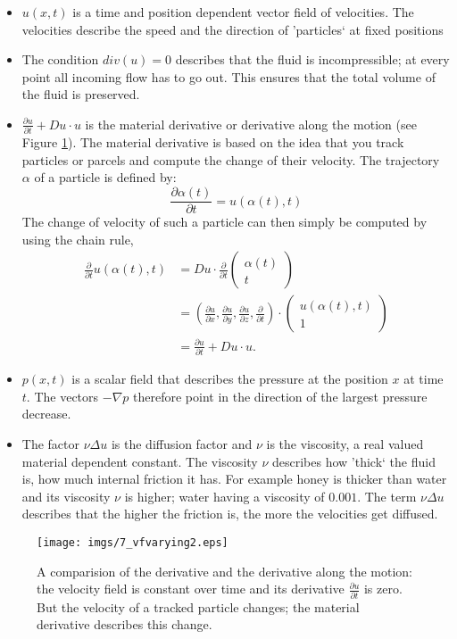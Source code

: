 \begin{itemize}
	\item $u(x,t)$ is a time and position dependent vector field of velocities. The velocities describe the speed and the direction of 'particles` at fixed positions
	\item The condition $div(u) = 0$ describes that the fluid is incompressible; at every point all incoming flow has to go out. This ensures that the total volume of the fluid is preserved.
	\item $\frac{\partial u}{\partial t} + D u \cdot u$ is the material derivative or derivative along the motion (see Figure \ref{fig:fsmaterialderivative}). The material derivative is based on the idea that you track particles or parcels and compute the change of their velocity. The trajectory $\alpha$ of a particle is defined by:
\[\frac{\partial \alpha(t)}{\partial t} = u(\alpha(t), t)\]
The change of velocity of such a particle can then simply be computed by using the chain rule,  
\begin{align*}\frac{\partial}{\partial t} u(\alpha(t),t) &= Du \cdot \frac{\partial}{\partial t}\begin{pmatrix}
\alpha(t) \\
t
\end{pmatrix}\\
&= (\frac{\partial u}{\partial x}, \frac{\partial u}{\partial y},\frac{\partial u}{\partial z}, \frac{\partial }{\partial t}) \cdot \begin{pmatrix}
u(\alpha(t),t) \\
1
\end{pmatrix} \\
&= \frac{\partial u}{\partial t} + Du \cdot u.
\end{align*}
\item $p(x,t)$ is a scalar field that describes the pressure at the position $x$ at time $t$. The vectors $-\nabla p$ therefore point in the direction of the largest pressure decrease.
\item The factor $\nu \Delta u$ is the diffusion factor and $\nu$ is the viscosity, a real valued material dependent constant. The viscosity $\nu$ describes how 'thick` the fluid is, how much internal friction it has. For example honey is thicker than water and its viscosity $\nu$ is higher; water having a viscosity of $0.001$. The term $\nu \Delta u$ describes that the higher the friction is, the more the velocities get diffused.
\end{itemize}

\begin{figure}%
\begin{center}
\texttt{[image: imgs/7\_vfvarying2.eps]}%
\end{center}
\caption{A comparision of the derivative and the derivative along the motion: the velocity field is constant over time and its derivative $\frac{\partial u}{\partial t}$ is zero. But the velocity of a tracked particle changes; the material derivative describes this change.}%
\label{fig:fsmaterialderivative}%
\end{figure}

